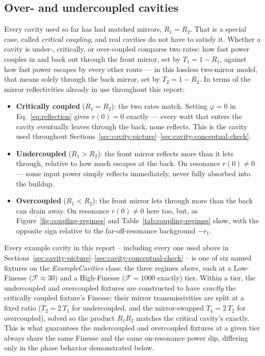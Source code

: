 \documentclass[9pt]{article}
\begin{document}
\subsection{Over- and undercoupled cavities}
\label{sec:cavity-coupling}
Every cavity used so far has had matched mirrors, $R_1=R_2$. That is a
special case, called \emph{critical coupling}, and real cavities do not have
to satisfy it. Whether a cavity is under-, critically, or over-coupled
compares two rates: how fast power couples in and back out through the front
mirror, set by $T_1=1-R_1$, against how fast power escapes by every other
route --- in this lossless two-mirror model, that means solely through the
back mirror, set by $T_2=1-R_2$. In terms of the mirror reflectivities
already in use throughout this report:
\begin{itemize}
\item \textbf{Critically coupled} ($R_1=R_2$): the two rates match. Setting
$\varphi=0$ in Eq.~\eqref{eq:reflection} gives $r(0)=0$ exactly --- every
watt that enters the cavity eventually leaves through the back, none
reflects. This is the cavity used throughout
Sections~\ref{sec:cavity-picture}--\ref{sec:cavity-conceptual-check}.
\item \textbf{Undercoupled} ($R_1>R_2$): the front mirror reflects more than
it lets through, relative to how much escapes at the back. On resonance
$r(0)\neq0$ --- some input power simply reflects immediately, never fully
absorbed into the buildup.
\item \textbf{Overcoupled} ($R_1<R_2$): the front mirror lets through more
than the back can drain away. On resonance $r(0)\neq0$ here too, but, as
Figure~\ref{fig:coupling-regimes} and Table~\ref{tab:coupling-regimes} show,
with the opposite sign relative to the far-off-resonance background $-r_1$.
\end{itemize}

Every example cavity in this report -- including every one used above in
Sections~\ref{sec:cavity-picture}--\ref{sec:cavity-conceptual-check} -- is
one of six named fixtures on the \textit{ExampleCavities} class: the three
regimes above, each at a Low-Finesse ($\mathcal{F}\approx30$) and a
High-Finesse ($\mathcal{F}=1000$ exactly) tier. Within a tier, the
undercoupled and overcoupled fixtures are constructed to have \emph{exactly}
the critically coupled fixture's Finesse: their mirror transmissivities are
split at a fixed ratio ($T_2=2\,T_1$ for undercoupled, and the mirror-swapped
$T_1=2\,T_2$ for overcoupled), solved so the product $R_1 R_2$ matches the
critical cavity's exactly. This is what guarantees the undercoupled and
overcoupled fixtures at a given tier always share the same Finesse and the
same on-resonance power dip, differing only in the phase behavior
demonstrated below.
\end{document}
